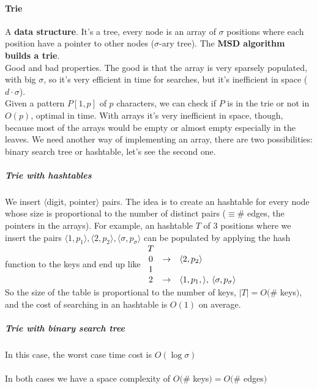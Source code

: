 \documentclass[10pt]{report}
\begin{document}
\paragraph{Trie} A \textbf{data structure}. It's a tree, every node is an array of $\sigma$ positions where each position have a pointer to other nodes ($\sigma$-ary tree). The \textbf{MSD algorithm builds a trie}.\\
Good and bad properties. The good is that the array is very sparsely populated, with big $\sigma$, so it's very efficient in time for searches, but it's inefficient in space ($d\cdot\sigma$).\\
Given a pattern $P[1,p]$ of $p$ characters, we can check if $P$ is in the trie or not in $O(p)$, optimal in time. With arrays it's very inefficient in space, though, because most of the arrays would be empty or almost empty especially in the leaves. We need another way of implementing an array, there are two possibilities: binary search tree or hashtable, let's see the second one.
\subparagraph{Trie with hashtables} We insert $\langle$digit, pointer$\rangle$ pairs. The idea is to create an hashtable for every node whose size is proportional to the number of distinct pairs ($\equiv\#$ edges, the pointers in the arrays). For example, an hashtable $T$ of $3$ positions where we insert the pairs $\langle 1,p_1\rangle, \langle 2,p_2\rangle, \langle \sigma,p_\sigma\rangle$ can be populated by applying the hash function to the keys and end up like $\begin{array}{c c l}
T\\
0&\rightarrow&\langle 2,p_2\rangle\\
1\\
2&\rightarrow&\langle 1,p_1,\rangle,\:\langle \sigma, p_\sigma\rangle
\end{array}$\\
So the size of the table is proportional to the number of keys, $|T|=O(\#$ keys$)$, and the cost of searching in an hashtable is $O(1)$ on average.
\subparagraph{Trie with binary search tree} In this case, the worst case time cost is $O(\log \sigma)$\\\\
In both cases we have a space complexity of $O(\#$ keys$)=O(\#$ edges$)$
\end{document}
